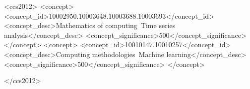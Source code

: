 \documentclass[sigconf]{acmart}
\begin{document}
\begin{CCSXML}
<ccs2012>
  <concept>
    <concept_id>10002950.10003648.10003688.10003693</concept_id>
    <concept_desc>Mathematics of computing~Time series analysis</concept_desc>
    <concept_significance>500</concept_significance>
  </concept>
  <concept>
    <concept_id>10010147.10010257</concept_id>
    <concept_desc>Computing methodologies~Machine learning</concept_desc>
    <concept_significance>500</concept_significance>
  </concept>

</ccs2012>
\end{CCSXML}



    \maketitle











\clearpage
\appendix


\end{document}
